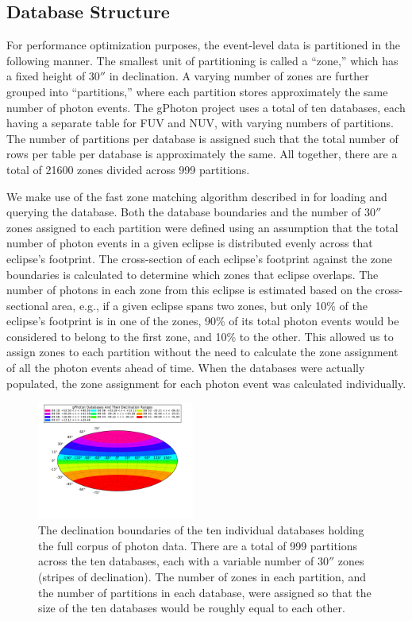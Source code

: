 \documentclass[trackchanges,preprint2]{aastex}
\begin{document}
\subsection{Database Structure}
For performance optimization purposes, the event-level data is partitioned in the following manner.  The smallest unit of partitioning is called a ``zone,'' which has a fixed height of $30''$ in declination.  A varying number of zones are further grouped into ``partitions,'' where each partition stores approximately the same number of photon events. The gPhoton project uses a total of ten databases, each having a separate table for FUV and NUV, with varying numbers of partitions.  The number of partitions per database is assigned such that the total number of rows per table per database is approximately the same. All together, there are a total of 21600 zones divided across 999 partitions.

We make use of the fast zone matching algorithm described in \citet{gra2006} for loading and querying the database. Both the database boundaries and the number of $30''$ zones assigned to each partition were defined using an assumption that the total number of photon events in a given eclipse is distributed evenly across that eclipse's footprint. The cross-section of each eclipse's footprint against the zone boundaries is calculated to determine which zones that eclipse overlaps. The number of photons in each zone from this eclipse is estimated based on the cross-sectional area, e.g., if a given eclipse spans two zones, but only 10\% of the eclipse's footprint is in one of the zones, 90\% of its total photon events would be considered to belong to the first zone, and 10\% to the other. This allowed us to assign zones to each partition without the need to calculate the zone assignment of all the photon events ahead of time. When the databases were actually populated, the zone assignment for each photon event was calculated individually.

\begin{figure}[h!]
\includegraphics[width=0.46\textwidth,keepaspectratio]{Fig01.pdf}
\caption{The declination boundaries of the ten individual databases holding the full corpus of photon data. There are a total of 999 partitions across the ten databases, each with a variable number of $30''$ zones (stripes of declination).  The number of zones in each partition, and the number of partitions in each database, were assigned so that the size of the ten databases would be roughly equal to each other. \label{dbdist}}
\end{figure}
\end{document}
